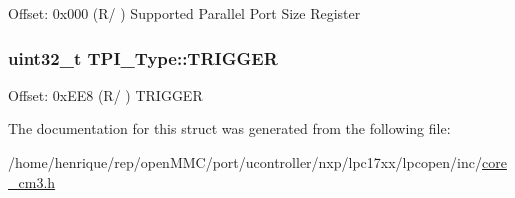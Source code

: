 Offset\-: 0x000 (R/ ) Supported Parallel Port Size Register \hypertarget{structTPI__Type_aa4b603c71768dbda553da571eccba1fe}{
\subsubsection[{T\-R\-I\-G\-G\-E\-R}]{ uint32\-\_\-t T\-P\-I\-\_\-\-Type\-::\-T\-R\-I\-G\-G\-E\-R}}\label{structTPI__Type_aa4b603c71768dbda553da571eccba1fe}
Offset\-: 0x\-E\-E8 (R/ ) T\-R\-I\-G\-G\-E\-R 

The documentation for this struct was generated from the following file\-:\begin{DoxyCompactItemize}
\item 
/home/henrique/rep/open\-M\-M\-C/port/ucontroller/nxp/lpc17xx/lpcopen/inc/\hyperlink{core__cm3_8h}{core\-\_\-cm3.\-h}\end{DoxyCompactItemize}
